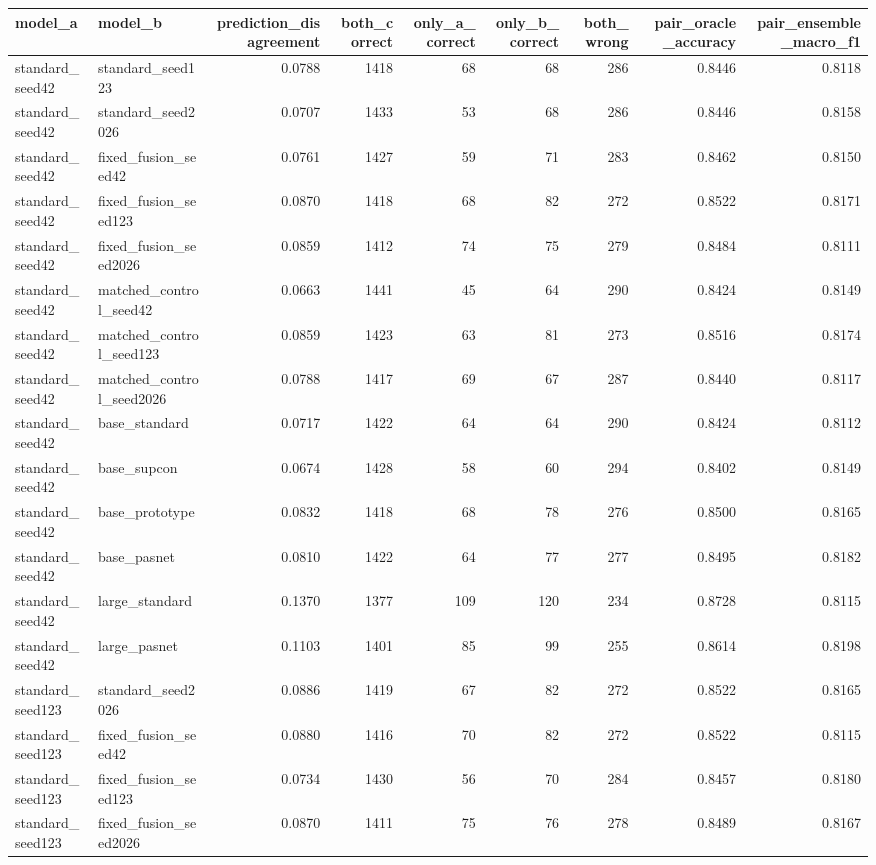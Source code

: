 \begin{tabular}{llrrrrrrr}
\toprule
model\_a & model\_b & prediction\_disagreement & both\_correct & only\_a\_correct & only\_b\_correct & both\_wrong & pair\_oracle\_accuracy & pair\_ensemble\_macro\_f1 \\
\midrule
standard\_seed42 & standard\_seed123 & 0.0788 & 1418 & 68 & 68 & 286 & 0.8446 & 0.8118 \\
standard\_seed42 & standard\_seed2026 & 0.0707 & 1433 & 53 & 68 & 286 & 0.8446 & 0.8158 \\
standard\_seed42 & fixed\_fusion\_seed42 & 0.0761 & 1427 & 59 & 71 & 283 & 0.8462 & 0.8150 \\
standard\_seed42 & fixed\_fusion\_seed123 & 0.0870 & 1418 & 68 & 82 & 272 & 0.8522 & 0.8171 \\
standard\_seed42 & fixed\_fusion\_seed2026 & 0.0859 & 1412 & 74 & 75 & 279 & 0.8484 & 0.8111 \\
standard\_seed42 & matched\_control\_seed42 & 0.0663 & 1441 & 45 & 64 & 290 & 0.8424 & 0.8149 \\
standard\_seed42 & matched\_control\_seed123 & 0.0859 & 1423 & 63 & 81 & 273 & 0.8516 & 0.8174 \\
standard\_seed42 & matched\_control\_seed2026 & 0.0788 & 1417 & 69 & 67 & 287 & 0.8440 & 0.8117 \\
standard\_seed42 & base\_standard & 0.0717 & 1422 & 64 & 64 & 290 & 0.8424 & 0.8112 \\
standard\_seed42 & base\_supcon & 0.0674 & 1428 & 58 & 60 & 294 & 0.8402 & 0.8149 \\
standard\_seed42 & base\_prototype & 0.0832 & 1418 & 68 & 78 & 276 & 0.8500 & 0.8165 \\
standard\_seed42 & base\_pasnet & 0.0810 & 1422 & 64 & 77 & 277 & 0.8495 & 0.8182 \\
standard\_seed42 & large\_standard & 0.1370 & 1377 & 109 & 120 & 234 & 0.8728 & 0.8115 \\
standard\_seed42 & large\_pasnet & 0.1103 & 1401 & 85 & 99 & 255 & 0.8614 & 0.8198 \\
standard\_seed123 & standard\_seed2026 & 0.0886 & 1419 & 67 & 82 & 272 & 0.8522 & 0.8165 \\
standard\_seed123 & fixed\_fusion\_seed42 & 0.0880 & 1416 & 70 & 82 & 272 & 0.8522 & 0.8115 \\
standard\_seed123 & fixed\_fusion\_seed123 & 0.0734 & 1430 & 56 & 70 & 284 & 0.8457 & 0.8180 \\
standard\_seed123 & fixed\_fusion\_seed2026 & 0.0870 & 1411 & 75 & 76 & 278 & 0.8489 & 0.8167 \\

\end{tabular}
